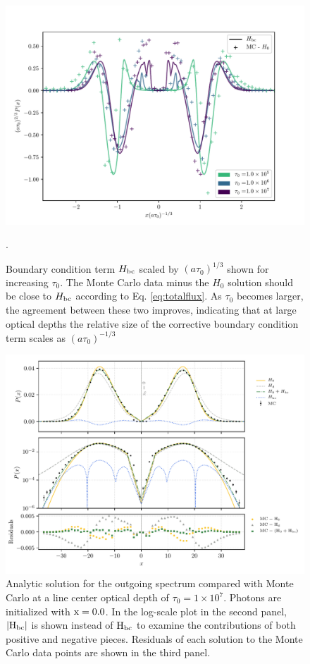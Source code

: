 \documentclass{aastex63}
\begin{document}
\ifx
\begin{figure}
    \centering
    \includegraphics{taubc.pdf}
    \caption{Boundary condition term $H_{\rm bc}$ scaled by $(a\tau_0)^{1/3}$ shown for increasing $\tau_0$. The Monte Carlo data minus the $H_0$ solution should be close to $H_{\rm bc}$ according to Eq. \ref{eq:totalflux}. As $\tau_0$ becomes larger, the agreement between these two improves, indicating that at large optical depths the relative size of the corrective boundary condition term scales as $(a\tau_0)^{-1/3}$}.
    \label{fig:taubc}
\end{figure}
\fi

\begin{figure}
    \centering
    \includegraphics{final_residual.pdf}
    \caption{Analytic solution for the outgoing spectrum compared with Monte Carlo at a line center optical depth of $\tau_0 = 1 \times 10^7$. Photons are initialized with $\rm x = 0.0$. In the log-scale plot in the second panel, $|\rm H_{bc}|$ is shown instead of $\rm H_{bc}$ to examine the contributions of both positive and negative pieces. Residuals of each solution to the Monte Carlo data points are shown in the third panel.} 
    \label{fig:sol_mc_residual_0}
\end{figure}
\end{document}
